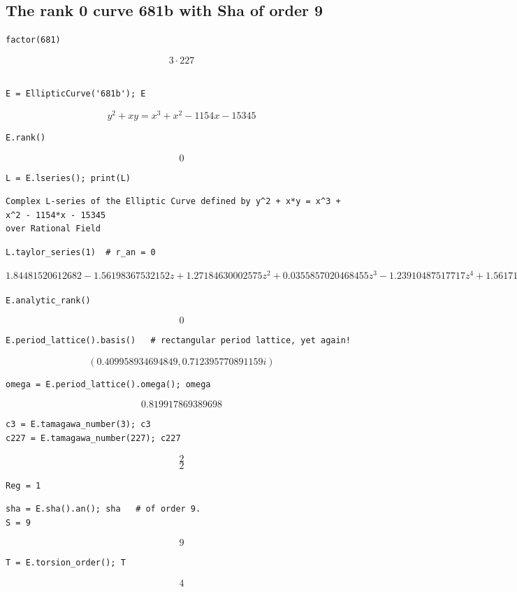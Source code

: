 \documentclass{book}
\begin{document}
\begin{lstlisting}
\end{lstlisting}\subsection{The rank 0 curve 681b with Sha of order 9}

\begin{lstlisting}
factor(681)
\end{lstlisting}$$3 \cdot 227$$
\begin{lstlisting}

E = EllipticCurve('681b'); E
\end{lstlisting}$$y^2 + x y = x^{3} + x^{2} - 1154 x - 15345 $$
\begin{lstlisting}
E.rank()
\end{lstlisting}$$0$$
\begin{lstlisting}
L = E.lseries(); print(L)
\end{lstlisting}\begin{verbatim}Complex L-series of the Elliptic Curve defined by y^2 + x*y = x^3 + x^2 - 1154*x - 15345
over Rational Field\end{verbatim}
\begin{lstlisting}
L.taylor_series(1)  # r_an = 0
\end{lstlisting}$$1.84481520612682 - 1.56198367532152z + 1.27184630002575z^{2} + 0.0355857020468455z^{3} - 1.23910487517717z^{4} + 1.56171745903846z^{5} + O(z^{6})$$
\begin{lstlisting}
E.analytic_rank()
\end{lstlisting}$$0$$
\begin{lstlisting}
E.period_lattice().basis()   # rectangular period lattice, yet again!
\end{lstlisting}$$\left(0.409958934694849, 0.712395770891159i\right)$$
\begin{lstlisting}
omega = E.period_lattice().omega(); omega
\end{lstlisting}$$0.819917869389698$$
\begin{lstlisting}
c3 = E.tamagawa_number(3); c3
c227 = E.tamagawa_number(227); c227
\end{lstlisting}$$2$$$$2$$
\begin{lstlisting}
Reg = 1
\end{lstlisting}
\begin{lstlisting}
sha = E.sha().an(); sha   # of order 9.
S = 9
\end{lstlisting}$$9$$
\begin{lstlisting}
T = E.torsion_order(); T
\end{lstlisting}$$4$$
\end{document}
